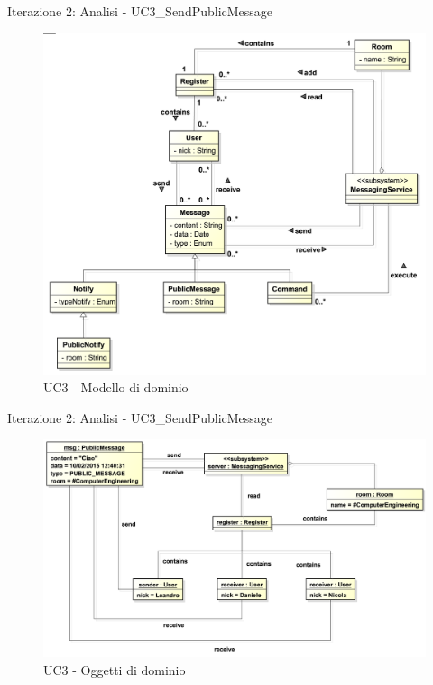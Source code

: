 \documentclass[t]{beamer} %
\begin{document}
\begin{frame} {Iterazione 2: Analisi - UC3\_SendPublicMessage}
   \begin{figure}
     \includegraphics[scale=0.27]{image_astah/Iteration_2_DomainModel/UC3_SendPublicMessage_DM.png}{\centering}
     \caption{UC3 - Modello di dominio}
     \label{fig_UC3_SPM_DM} 
   \end{figure}
\end{frame}

\begin{frame} {Iterazione 2: Analisi - UC3\_SendPublicMessage}
   \begin{figure}
     \includegraphics[scale=0.315]{image_astah/Iteration_2_DomainModel/UC3_SendPublicMessage_OM.png}{\centering}
     \caption{UC3 - Oggetti di dominio}
     \label{fig_UC3_SPM_OM} 
   \end{figure}
\end{frame}
\end{document}
